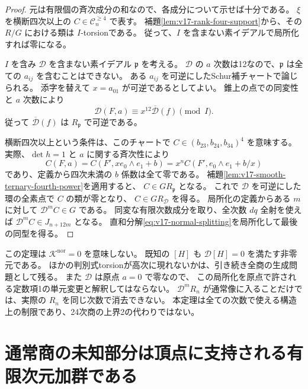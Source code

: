 \begin{proof}
元は有限個の斉次成分の和なので、各成分について示せば十分である。
$\xi$ を横断四次以上の $C\in\mathcal C_n^{\ge4}$ で表す。
補題\ref{lem:v17-rank-four-support}から、その $R/G$ における類は $I$-torsionである。
従って、$I$ を含まない素イデアルで局所化すれば零になる。

$I$ を含み $\mathscr D$ を含まない素イデアル $\mathfrak p$ を考える。
$\mathscr D$ の $a$ 次数は12なので、$\mathfrak p$ は全ての $a_{ij}$ を含むことはできない。
ある $a_{ij}$ を可逆にしたSchur補チャートで論じられる。
添字を替えて $x=a_{01}$ が可逆であるとしてよい。
錐上の点での同変性と $a$ 次数により
\[
 \mathscr D(F,a)\equiv x^{12}\overline{\mathscr D}(f)\pmod I.
\]
従って $\overline{\mathscr D}(f)$ は $R_{\mathfrak p}$ で可逆である。

横断四次以上という条件は、このチャートで
$C\in(b_{23},b_{24},b_{34})^4$ を意味する。
実際、$\det h=1$ と $a$ に関する斉次性により
\[
 C(F,a)=C(F',xe_0\wedge e_1+b)
       =x^n C(F',e_0\wedge e_1+b/x)
\]
であり、定義から四次未満の $b$ 係数は全て零である。
補題\ref{lem:v17-smooth-ternary-fourth-power}を適用すると、
$C\in GR_{\mathfrak p}$ となる。
これで $\mathscr D$ を可逆にした環の全素点で $C$ の類が零となり、
$C\in GR_{\mathscr D}$ を得る。
局所化の定義からある $m$ に対して $\mathscr D^mC\in G$ である。
同変な有限次数成分を取り、全次数 $dq$ 全射を使えば
$\mathscr D^mC\in J_{n+12m}$ となる。
直和分解\eqref{eq:v17-normal-splitting}を局所化して最後の同型を得る。
\end{proof}

\begin{remark}[局所化で見えなくなる部分は依然として未決定]
この定理は $\mathcal K^{\mathrm{nor}}=0$ を意味しない。
既知の $[H]$ も $\mathscr D[H]=0$ を満たす非零元である。
ほかの判別式torsionが高次に現れないかは、引き続き全商の生成問題として残る。
また $\mathscr D$ は原点 $a=0$ で零なので、
この局所化を原点で許される定数項1の単元変更と解釈してはならない。
$\mathscr D^mR_n$ が通常像に入ることだけでは、実際の $R_n$ を同じ次数で消去できない。
本定理は全ての次数で使える構造上の制限であり、24次商の上界2の代わりではない。
\end{remark}




\section{通常商の未知部分は頂点に支持される有限次元加群である}
\label{sec:v17-vertex-finiteness}

